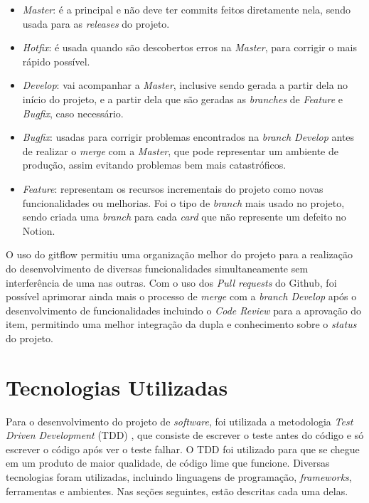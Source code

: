 \begin{itemize}
    \item \textit{Master}: é a principal e não deve ter commits feitos diretamente nela, sendo usada para as \textit{releases} do projeto. 
    \item \textit{Hotfix}: é usada quando são descobertos erros na \textit{Master}, para corrigir o mais rápido possível.
    \item \textit{Develop}: vai acompanhar a \textit{Master}, inclusive sendo gerada a partir dela no início do projeto, e a partir dela que são geradas as \textit{branches} de \textit{Feature} e \textit{Bugfix}, caso necessário.
    \item \textit{Bugfix}: usadas para corrigir problemas encontrados na \textit{branch Develop} antes de realizar o \textit{merge} com a \textit{Master}, que pode representar um ambiente de produção, assim evitando problemas bem mais catastróficos.
    \item \textit{Feature}: representam os recursos incrementais do projeto como novas funcionalidades ou melhorias. Foi o tipo de \textit{branch} mais usado no projeto, sendo criada uma \textit{branch} para cada \textit{card} que não represente um defeito no Notion.
\end{itemize}

O uso do gitflow permitiu uma organização melhor do projeto para a realização do desenvolvimento de diversas funcionalidades simultaneamente sem interferência de uma nas outras. Com o uso dos \textit{Pull requests} do Github, foi possível aprimorar ainda mais o processo de \textit{merge} com a \textit{branch Develop} após o desenvolvimento de funcionalidades incluindo o \textit{Code Review} para a aprovação do item, permitindo uma melhor integração da dupla e conhecimento sobre o \textit{status} do projeto.

\section{Tecnologias Utilizadas}

Para o desenvolvimento do projeto de \textit{software}, foi utilizada a metodologia \textit{Test Driven Development} (TDD) \cite{tdd}, que consiste de escrever o teste antes do código e só escrever o código após ver o teste falhar. O TDD foi utilizado para que se chegue em um produto de maior qualidade, de código lime que funcione. Diversas tecnologias foram utilizadas, incluindo linguagens de programação, \textit{frameworks}, ferramentas e ambientes. Nas seções seguintes, estão descritas cada uma delas.

